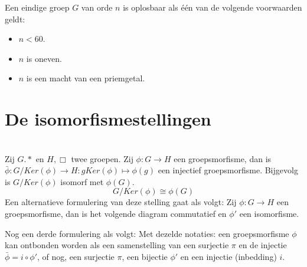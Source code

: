 \documentclass[main.tex]{subfiles}
\begin{document}
\begin{st}
  Een eindige groep $G$ van orde $n$ is oplosbaar als \'e\'en van de volgende voorwaarden geldt:
  \begin{itemize}
  \item $n < 60$.
  \item $n$ is oneven.
  \item $n$ is een macht van een priemgetal.
  \end{itemize}
  \zb 
\end{st}

\section{De isomorfismestellingen}
\label{sec:isomorfismestellingen}

\begin{st}
  \label{st:eerste-isomorfismestelling}
  \\
  Zij $G.*$ en $H,\Box$ twee groepen.
  Zij $\phi: G \rightarrow H$ een groepsmorfisme, dan is $\bar{\phi}: G/Ker(\phi) \rightarrow H: gKer(\phi) \mapsto \phi(g)$ een injectief groepsmorfisme.
  Bijgevolg is $G/Ker(\phi)$ isomorf met $\phi(G)$. 
  \[ G/Ker(\phi) \cong \phi(G) \]
  Een alternatieve formulering van deze stelling gaat als volgt:
  Zij $\phi: G \rightarrow H$ een groepsmorfisme, dan is het volgende diagram commutatief en $\phi'$ een isomorfisme.
  \begin{figure}[H]
    \centering
  \end{figure}
  Nog een derde formulering als volgt:
  Met dezelde notaties: een groepsmorfisme $\phi$ kan ontbonden worden als een samenstelling van een surjectie $\pi$ en de injectie $\bar{\phi} = i \circ \phi'$, of nog, een surjectie $\pi$, een bijectie $\phi'$ en een injectie (inbedding) $i$.


\end{st}
\end{document}
